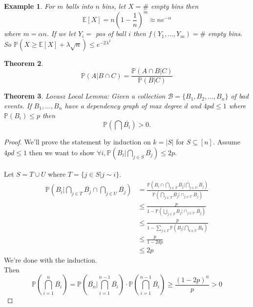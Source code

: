 \documentclass[a4paper]{article}
\newtheorem{thm}{Theorem}[section]
\newtheorem{eg}[thm]{Example}
\begin{document}
\begin{eg}
    For $m$ balls into $n$ bins, let $X=\#$ empty bins then $$\mathbb{E}[X]=n\left (1-\frac{1}{n}\right )^m\approx ne^{-\alpha}$$ where $m=\alpha n.$ If we let $Y_i=$ pos of ball $i$ then $f(Y_1,...,Y_m)=\#$ empty bins. So $\mathbb{P}(X\geq \mathbb{E}[X]+\lambda \sqrt{n})\leq e^{-2\lambda^2}$
\end{eg}
\begin{thm}
    $$\mathbb{P}(A | B \cap C)=\frac{\mathbb{P}(A\cap B | C)}{\mathbb{P}(B | C)}$$
\end{thm}
\begin{thm}
    Lovasz Local Lemma: Given a collection $\mathcal{B}=\{B_1,B_2,...,B_n\}$ of bad events. If $B_1,...,B_n$ have a dependency graph of max degree $d$ and $4pd\leq 1$ where $\mathbb{P}(B_i)\leq p$ then $$\mathbb{P}\left (\bigcap \overline{B_i} \right )>0.$$
\end{thm}
\begin{proof}
    We'll prove the statement by induction on $k=|S|$ for $S\subseteq [n].$ Assume $4pd\leq 1$ then we want to show $\forall i, \mathbb{P}\left (B_i | \bigcap _{j\in S}\overline{B_j} \right ) \leq 2p.$\\\\
    Let $S=T\cup U$ where $T=\{j\in S | j\sim i\}.$\\
    \begin{align*}
        \mathbb{P}\left (B_i | \bigcap_{j\in T}\overline{B_j} \cap \bigcap_{j\in U}\overline{B_j}\right )&=\frac{\mathbb{P}\left (B_i  \cap \bigcap_{j\in T}\overline{B_j} | \bigcap_{j\in U}\overline{B_j}\right )}{\mathbb{P}\left (\bigcap_{j\in T}\overline{B_j}|\cap_{j\in U}\overline{B_j}\right )}\\
        &\leq \frac{p}{1-\mathbb{P}\left (\bigcup_{j\in T}B_j|\cap_{j\in U}\overline{B_j}\right )}\\
        &\leq \frac{p}{1-\sum_{j \in T}\mathbb{P}(B_j | \bigcap_{k\in U}\overline{B_k})}\\
        &\leq \frac{p}{1-2dp} \tag{Induction Hypothesis}\\
        &\leq 2p \tag{Assumption}
    \end{align*}
    We're done with the induction. \\
    Then $$\mathbb{P}\left (\bigcap_{i=1}^n\overline{B_i} \right)=\mathbb{P}\left (\overline{B_n}|\bigcap _{i=1}^{n-1}\overline{B_i} \right )\cdot \mathbb{P}\left (\bigcap _{i=1}^{n-1}\overline{B_i} \right )\geq \frac{(1-2p)^n}{p}>0   $$
\end{proof}
\end{document}
